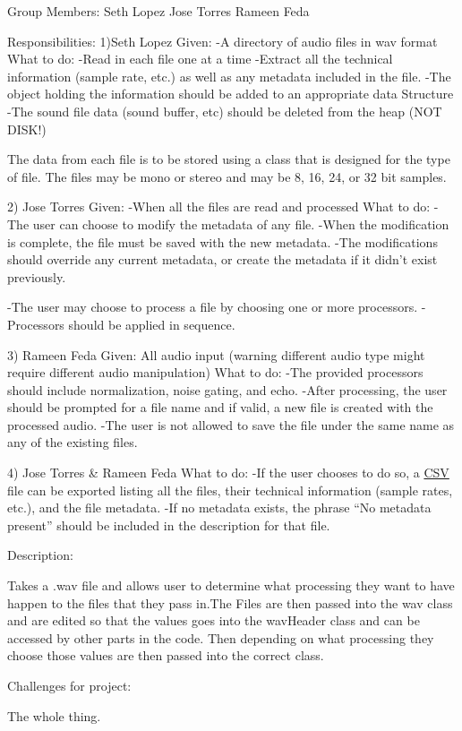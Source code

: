 Group Members\+: Seth Lopez Jose Torres Rameen Feda

Responsibilities\+: 1)Seth Lopez Given\+: -\/A directory of audio files in wav format What to do\+: -\/\+Read in each file one at a time -\/\+Extract all the technical information (sample rate, etc.) as well as any metadata included in the file. -\/\+The object holding the information should be added to an appropriate data Structure -\/\+The sound file data (sound buffer, etc) should be deleted from the heap (N\+OT D\+I\+S\+K!)

The data from each file is to be stored using a class that is designed for the type of file. The files may be mono or stereo and may be 8, 16, 24, or 32 bit samples.

2) Jose Torres Given\+: -\/\+When all the files are read and processed What to do\+: -\/\+The user can choose to modify the metadata of any file. -\/\+When the modification is complete, the file must be saved with the new metadata. -\/\+The modifications should override any current metadata, or create the metadata if it didn’t exist previously.

-\/\+The user may choose to process a file by choosing one or more processors. -\/\+Processors should be applied in sequence.

3) Rameen Feda Given\+: All audio input (warning different audio type might require different audio manipulation) What to do\+: -\/\+The provided processors should include normalization, noise gating, and echo. -\/\+After processing, the user should be prompted for a file name and if valid, a new file is created with the processed audio. -\/\+The user is not allowed to save the file under the same name as any of the existing files.

4) Jose Torres \& Rameen Feda What to do\+: -\/\+If the user chooses to do so, a \hyperlink{classCSV}{C\+SV} file can be exported listing all the files, their technical information (sample rates, etc.), and the file metadata. -\/\+If no metadata exists, the phrase “\+No metadata present” should be included in the description for that file.

Description\+:

Takes a .wav file and allows user to determine what processing they want to have happen to the files that they pass in.\+The Files are then passed into the wav class and are edited so that the values goes into the wav\+Header class and can be accessed by other parts in the code. Then depending on what processing they choose those values are then passed into the correct class.

Challenges for project\+:

The whole thing. 